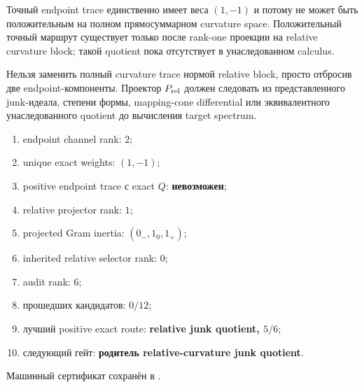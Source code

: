 \begin{theorem}
Точный endpoint trace единственно имеет веса $(1,-1)$ и потому не может
быть положительным на полном прямосуммарном curvature space. Положительный
точный маршрут существует только после rank-one проекции на relative
curvature block; такой quotient пока отсутствует в унаследованном calculus.
\end{theorem}

\begin{nogocriterion}
Нельзя заменить полный curvature trace нормой relative block, просто
отбросив две endpoint-компоненты. Проектор $P_{\rm rel}$ должен следовать
из представленного junk-идеала, степени формы, mapping-cone differential
или эквивалентного унаследованного quotient до вычисления target spectrum.
\end{nogocriterion}

\begin{protocol}\begin{enumerate}
\item endpoint channel rank: \textbf{$2$};
\item unique exact weights: \textbf{$(1,-1)$};
\item positive endpoint trace с exact $Q$: \textbf{невозможен};
\item relative projector rank: \textbf{$1$};
\item projected Gram inertia: \textbf{$(0_-,1_0,1_+)$};
\item inherited relative selector rank: \textbf{$0$};
\item audit rank: \textbf{$6$};
\item прошедших кандидатов: \textbf{$0/12$};
\item лучший positive exact route: \textbf{relative junk quotient, $5/6$};
\item следующий гейт: \textbf{родитель relative-curvature junk quotient}.
\end{enumerate}\end{protocol}

Машинный сертификат сохранён в
.